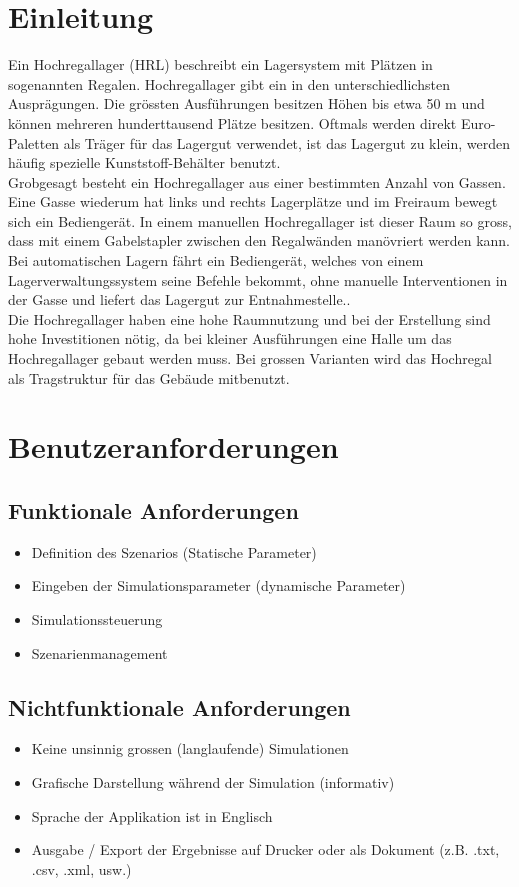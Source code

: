 \documentclass[11pt,a4paper]{article}
\begin{document}
\section{Einleitung}
Ein Hochregallager (HRL) beschreibt ein Lagersystem mit Plätzen in sogenannten Regalen. Hochregallager gibt ein in den unterschiedlichsten Ausprägungen. Die grössten Ausführungen besitzen Höhen bis etwa 50 m und können mehreren hunderttausend Plätze besitzen. Oftmals werden direkt Euro-Paletten als Träger für das Lagergut verwendet, ist das Lagergut zu klein, werden häufig spezielle Kunststoff-Behälter benutzt.\\
Grobgesagt besteht ein Hochregallager aus einer bestimmten Anzahl von Gassen. Eine Gasse wiederum hat links und rechts Lagerplätze und im Freiraum bewegt sich ein Bediengerät. In einem manuellen Hochregallager ist dieser Raum so gross, dass mit einem Gabelstapler zwischen den Regalwänden manövriert werden kann. Bei automatischen Lagern fährt ein Bediengerät, welches von einem Lagerverwaltungssystem seine Befehle bekommt, ohne manuelle Interventionen in der Gasse und liefert das Lagergut zur Entnahmestelle..\\
Die Hochregallager haben eine hohe Raumnutzung und bei der Erstellung sind hohe Investitionen nötig, da bei kleiner Ausführungen eine Halle um das Hochregallager gebaut werden muss. Bei grossen Varianten wird das Hochregal als Tragstruktur für das Gebäude mitbenutzt. 
%
\section{Benutzeranforderungen}
%
\subsection{Funktionale Anforderungen}
\begin{itemize}
  \item Definition des Szenarios (Statische Parameter)
  \item Eingeben der Simulationsparameter (dynamische Parameter)
  \item Simulationssteuerung
  \item Szenarienmanagement
\end{itemize}
%
\subsection{Nichtfunktionale Anforderungen}
\begin{itemize}
  \item Keine unsinnig grossen (langlaufende) Simulationen
  \item Grafische Darstellung während der Simulation (informativ)
  \item Sprache der Applikation ist in Englisch
  \item Ausgabe / Export der Ergebnisse auf Drucker oder als Dokument (z.B. .txt, .csv, .xml, usw.)
\end{itemize}
\end{document}

